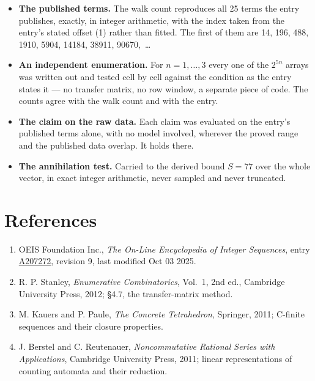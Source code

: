 \documentclass[11pt]{article}
\theoremstyle{definition}
\begin{document}
\begin{itemize}

\item {\bfseries The published terms.} The walk count reproduces all 25 terms the entry publishes, exactly, in integer arithmetic, with the index taken from the entry's stated offset (1) rather than fitted. The first of them are 14, 196, 488, 1910, 5904, 14184, 38911, 90670,~\dots

\item {\bfseries An independent enumeration.} For $n = 1,\dots,3$ every one of the $2^{5n}$ arrays was written out and tested cell by cell against the condition as the entry states it --- no transfer matrix, no row window, a separate piece of code. The counts agree with the walk count and with the entry.

\item {\bfseries The claim on the raw data.} Each claim was evaluated on the entry's published terms alone, with no model involved, wherever the proved range and the published data overlap. It holds there.

\item {\bfseries The annihilation test.} Carried to the derived bound $S = 77$ over the whole vector, in exact integer arithmetic, never sampled and never truncated.

\end{itemize}

\section{References}

\begin{enumerate}

\item OEIS Foundation Inc., \emph{The On-Line Encyclopedia of Integer Sequences}, entry \href{https://oeis.org/A207272}{A207272}, revision 9, last modified Oct 03 2025.

\item R. P. Stanley, \emph{Enumerative Combinatorics}, Vol.~1, 2nd ed., Cambridge University Press, 2012; \S4.7, the transfer-matrix method.

\item M. Kauers and P. Paule, \emph{The Concrete Tetrahedron}, Springer, 2011; C-finite sequences and their closure properties.

\item J. Berstel and C. Reutenauer, \emph{Noncommutative Rational Series with Applications}, Cambridge University Press, 2011; linear representations of counting automata and their reduction.

\end{enumerate}
\end{document}
